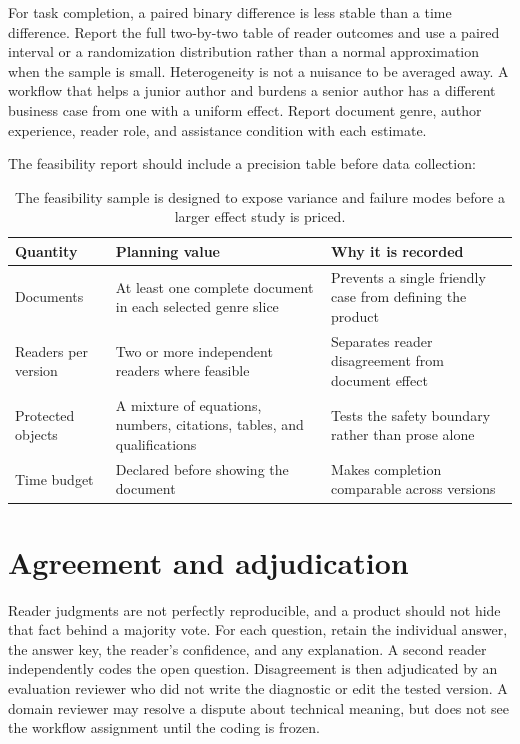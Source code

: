 For task completion, a paired binary difference is less stable than a time
difference. Report the full two-by-two table of reader outcomes and use a
paired interval or a randomization distribution rather than a normal
approximation when the sample is small. Heterogeneity is not a nuisance to be
averaged away. A workflow that helps a junior author and burdens a senior
author has a different business case from one with a uniform effect. Report
document genre, author experience, reader role, and assistance condition with
each estimate.

The feasibility report should include a precision table before data collection:

\begin{table}[H]
\centering
\small
\begin{tabularx}{\textwidth}{@{}p{}p{}L@{}}
\toprule
Quantity & Planning value & Why it is recorded \\
\midrule
Documents & At least one complete document in each selected genre slice &
Prevents a single friendly case from defining the product \\
Readers per version & Two or more independent readers where feasible &
Separates reader disagreement from document effect \\
Protected objects & A mixture of equations, numbers, citations, tables, and
qualifications & Tests the safety boundary rather than prose alone \\
Time budget & Declared before showing the document & Makes completion comparable
across versions \\
\bottomrule
\end{tabularx}
\caption{The feasibility sample is designed to expose variance and failure
modes before a larger effect study is priced.}
\label{tab:eval-precision-plan}
\end{table}

\section{Agreement and adjudication}
\label{sec:eval-agreement}

Reader judgments are not perfectly reproducible, and a product should not hide
that fact behind a majority vote. For each question, retain the individual
answer, the answer key, the reader's confidence, and any explanation. A second
reader independently codes the open question. Disagreement is then adjudicated
by an evaluation reviewer who did not write the diagnostic or edit the tested
version. A domain reviewer may resolve a dispute about technical meaning, but
does not see the workflow assignment until the coding is frozen.

